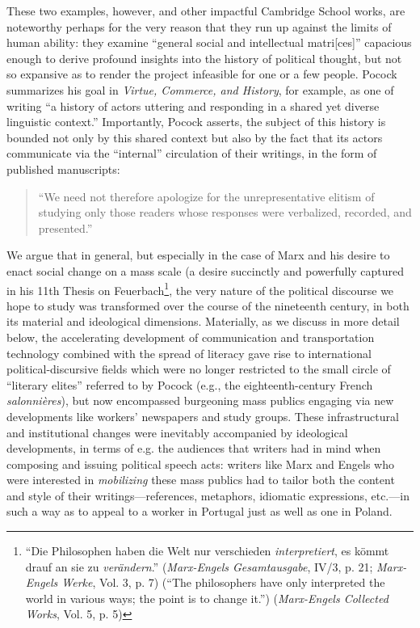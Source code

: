 \documentclass[11pt]{article}
\begin{document}
These two examples, however, and other impactful Cambridge School works, are noteworthy perhaps for the very reason that they run up against the limits of human ability: they examine ``general social and intellectual matri[ces]'' capacious enough to derive profound insights into the history of political thought, but not so expansive as to render the project infeasible for one or a few people. Pocock summarizes his goal in \textit{Virtue, Commerce, and History}, for example, as one of writing ``a history of actors uttering and responding in a shared yet diverse linguistic context.'' Importantly, Pocock asserts, the subject of this history is bounded not only by this shared context but also by the fact that its actors communicate via the ``internal'' circulation of their writings, in the form of published manuscripts:
\begin{quote}	
	``We need not therefore apologize for the unrepresentative elitism of studying only those readers whose responses were verbalized, recorded, and presented.'' \citep[p. 18]{pocock_virtue_1985}
\end{quote}

We argue that in general, but especially in the case of Marx and his desire to enact social change on a mass scale (a desire succinctly and powerfully captured in his 11th Thesis on Feuerbach\footnote{``Die Philosophen haben die Welt nur verschieden \textit{interpretiert}, es kömmt drauf an sie zu \textit{verändern}.'' (\textit{Marx-Engels Gesamtausgabe}, IV/3, p. 21; \textit{Marx-Engels Werke}, Vol. 3, p. 7) (``The philosophers have only interpreted the world in various ways; the point is to change it.'') (\textit{Marx-Engels Collected Works}, Vol. 5, p. 5)}, the very nature of the political discourse we hope to study was transformed over the course of the nineteenth century, in both its material and ideological dimensions. Materially, as we discuss in more detail below, the accelerating development of communication and transportation technology combined with the spread of literacy gave rise to international political-discursive fields which were no longer restricted to the small circle of ``literary elites'' referred to by Pocock (e.g., the eighteenth-century French \textit{salonnières}), but now encompassed burgeoning mass publics engaging via new developments like workers' newspapers and study groups. These infrastructural and institutional changes were inevitably accompanied by ideological developments, in terms of e.g. the audiences that writers had in mind when composing and issuing political speech acts: writers like Marx and Engels who were interested in \textit{mobilizing} these mass publics had to tailor both the content and style of their writings---references, metaphors, idiomatic expressions, etc.---in such a way as to appeal to a worker in Portugal just as well as one in Poland.
\end{document}
